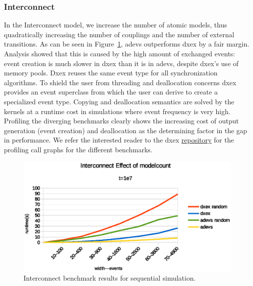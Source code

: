 \subsubsection{Interconnect}\label{4-seq-Interconnect}
In the Interconnect model, we increase the number of atomic models, thus quadratically increasing the number of couplings and the number of external transitions.
As can be seen in Figure~\ref{fig:Interconnect_benchmark}, adevs outperforms dxex by a fair margin.
Analysis showed that this is caused by the high amount of exchanged events: event creation is much slower in dxex than it is in adevs, despite dxex's use of memory pools. Dxex reuses the same event type for all synchronization algorithms. To shield the user from threading and deallocation concerns dxex provides an event superclass from which the user can derive to create a specialized event type. Copying and deallocation semantics are solved by the kernels at a runtime cost in simulations where event frequency is very high. Profiling the diverging benchmarks clearly shows the increasing cost of output generation (event creation) and deallocation as the determining factor in the gap in performance. We refer the interested reader to the dxex \hyperref{https://bitbucket.org/bcardoen/devs-ex-machina}{}{repo}{repository} for the profiling call graphs for the different benchmarks.


\begin{figure}
	\center
	\includegraphics[width=\plotfraction\columnwidth]{fig/interconnect_sequential.eps}
	\caption{Interconnect benchmark results for sequential simulation.}
	\label{fig:Interconnect_benchmark}
\end{figure}
